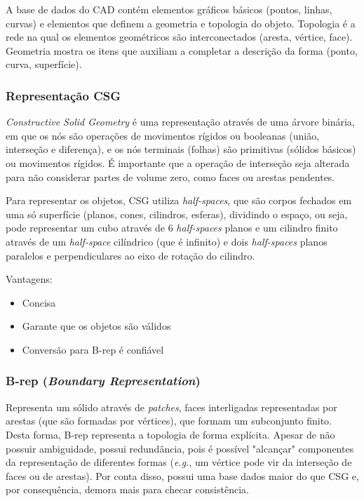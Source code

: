 \documentclass[a4paper]{report}
\begin{document}
A base de dados do CAD contém elementos gráficos básicos (pontos, linhas, curvas) e elementos que definem a geometria e topologia do objeto. Topologia é a rede na qual os elementos geométricos são interconectados (aresta, vértice, face). Geometria mostra os itens que auxiliam a completar a descrição da forma (ponto, curva, superfície).

\subsubsection*{Representação CSG}

\emph{Constructive Solid Geometry} é uma representação através de uma árvore binária, em que os nós são operações de movimentos rígidos ou booleanas (união, interseção e diferença), e os nós terminais (folhas) são primitivas (sólidos básicos) ou movimentos rígidos. É importante que a operação de interseção seja alterada para não considerar partes de volume zero, como faces ou arestas pendentes.

Para representar os objetos, CSG utiliza \emph{half-spaces}, que são corpos fechados em uma só superfície (planos, cones, cilindros, esferas), dividindo o espaço, ou seja, pode representar um cubo através de 6 \emph{half-spaces} planos e um cilindro finito através de um \emph{half-space} cilíndrico (que é infinito) e dois \emph{half-spaces} planos paralelos e perpendiculares ao eixo de rotação do cilindro.

Vantagens:
\begin{itemize}
    \item Concisa
    \item Garante que os objetos são válidos
    \item Conversão para B-rep é confiável
\end{itemize}

\subsubsection*{B-rep (\emph{Boundary Representation})}

Representa um sólido através de \emph{patches}, faces interligadas representadas por arestas (que são formadas por vértices), que formam um subconjunto finito. Desta forma, B-rep representa a topologia de forma explícita. Apesar de não possuir ambiguidade, possui redundância, pois é possível "alcançar" componentes da representação de diferentes formas (\emph{e.g.}, um vértice pode vir da interseção de faces ou de arestas). Por conta disso, possui uma base dados maior do que CSG e, por consequência, demora mais para checar consistência.
\end{document}
